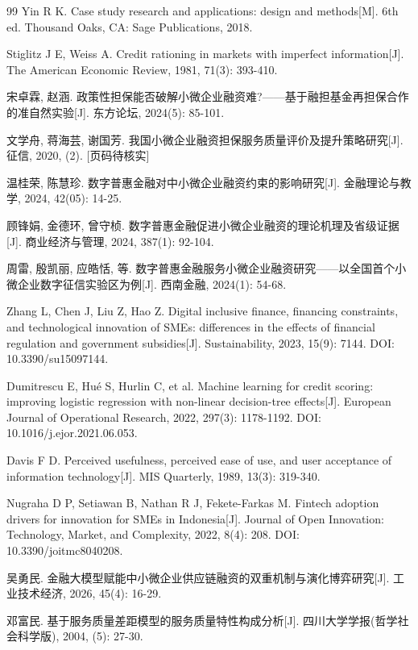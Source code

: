 \begin{thebibliography}{99}
 Yin R K. Case study research and applications: design and methods[M]. 6th ed. Thousand Oaks, CA: Sage Publications, 2018.

 Stiglitz J E, Weiss A. Credit rationing in markets with imperfect information[J]. The American Economic Review, 1981, 71(3): 393-410.

 宋卓霖, 赵涵. 政策性担保能否破解小微企业融资难?——基于融担基金再担保合作的准自然实验[J]. 东方论坛, 2024(5): 85-101.

 文学舟, 蒋海芸, 谢国芳. 我国小微企业融资担保服务质量评价及提升策略研究[J]. 征信, 2020, (2). [页码待核实]

 温桂荣, 陈慧珍. 数字普惠金融对中小微企业融资约束的影响研究[J]. 金融理论与教学, 2024, 42(05): 14-25.

 顾锋娟, 金德环, 曾守桢. 数字普惠金融促进小微企业融资的理论机理及省级证据[J]. 商业经济与管理, 2024, 387(1): 92-104.

 周雷, 殷凯丽, 应皓恬, 等. 数字普惠金融服务小微企业融资研究——以全国首个小微企业数字征信实验区为例[J]. 西南金融, 2024(1): 54-68.

 Zhang L, Chen J, Liu Z, Hao Z. Digital inclusive finance, financing constraints, and technological innovation of SMEs: differences in the effects of financial regulation and government subsidies[J]. Sustainability, 2023, 15(9): 7144. DOI: 10.3390/su15097144.

 Dumitrescu E, Hu\'{e} S, Hurlin C, et al. Machine learning for credit scoring: improving logistic regression with non-linear decision-tree effects[J]. European Journal of Operational Research, 2022, 297(3): 1178-1192. DOI: 10.1016/j.ejor.2021.06.053.

 Davis F D. Perceived usefulness, perceived ease of use, and user acceptance of information technology[J]. MIS Quarterly, 1989, 13(3): 319-340.

 Nugraha D P, Setiawan B, Nathan R J, Fekete-Farkas M. Fintech adoption drivers for innovation for SMEs in Indonesia[J]. Journal of Open Innovation: Technology, Market, and Complexity, 2022, 8(4): 208. DOI: 10.3390/joitmc8040208.

 吴勇民. 金融大模型赋能中小微企业供应链融资的双重机制与演化博弈研究[J]. 工业技术经济, 2026, 45(4): 16-29.

 邓富民. 基于服务质量差距模型的服务质量特性构成分析[J]. 四川大学学报(哲学社会科学版), 2004, (5): 27-30.


\end{thebibliography}
